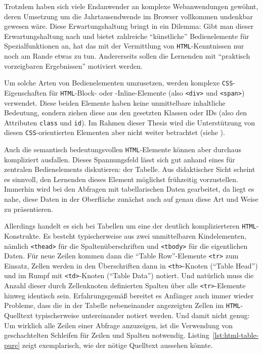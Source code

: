 Trotzdem haben sich viele Endanwender an komplexe Webanwendungen gewöhnt, deren Umsetzung um die Jahrtausendwende im Browser vollkommen undenkbar gewesen wäre. Diese Erwartungshaltung bringt \idename{} in ein Dilemma: Gibt man dieser Erwartungshaltung nach und bietet zahlreiche "`künstliche"' Bedienelemente für Spezialfunktionen an, hat das mit der Vermittlung von \texttt{HTML}-Kenntnissen nur noch am Rande etwas zu tun. Andererseits sollen die Lernenden mit "`praktisch vorzeigbaren Ergebnissen"' motiviert werden.

Um solche Arten von Bedienelementen umzusetzen, werden komplexe \texttt{CSS}-Eigenschaften für \texttt{HTML}-Block- oder -Inline-Elemente (also \texttt{<div>} und \texttt{<span>}) verwendet. Diese beiden Elemente haben keine unmittelbare inhaltliche Bedeutung, sondern ziehen diese aus den gesetzten Klassen oder IDs (also den Attributen \texttt{class} und \texttt{id}). Im Rahmen dieser Thesis wird die Unterstützung von diesen \texttt{CSS}-orientierten Elementen aber nicht weiter betrachtet (siehe ).

Auch die semantisch bedeutungsvollen \texttt{HTML}-Elemente können aber durchaus kompliziert ausfallen. Dieses Spannungsfeld lässt sich gut anhand eines für \idename{} zentralen Bedienelements diskutieren: der Tabelle. Aus didaktischer Sicht scheint es sinnvoll, den Lernenden dieses Element möglichst frühzeitig vorzustellen. Immerhin wird bei den Abfragen mit tabellarischen Daten gearbeitet, da liegt es nahe, diese Daten in der Oberfläche zunächst auch auf genau diese Art und Weise zu präsentieren.

Allerdings handelt es sich bei Tabellen um eine der deutlich komplizierteren \texttt{HTML}-Konstrukte. Es besteht typischerweise aus zwei unmittelbaren Kindelementen, nämlich \texttt{<thead>} für die Spaltenüberschriften und \texttt{<tbody>} für die eigentlichen Daten. Für neue Zeilen kommen dann die "`Table Row"'-Elemente \texttt{<tr>} zum Einsatz, Zellen werden in den Überschriften dann in \texttt{<th>}-Knoten ("`Table Head"') und im Rumpf mit \texttt{<td>}-Knoten ("`Table Data"') notiert. Und natürlich muss die Anzahl dieser durch Zellenknoten definierten Spalten über alle \texttt{<tr>}-Elemente hinweg identisch sein. Erfahrungsgemäß bereitet es Anfänger auch immer wieder Probleme, dass die in der Tabelle nebeneinander angezeigten Zellen im \texttt{HTML}-Quelltext typischerweise untereinander notiert werden. Und damit nicht genug: Um wirklich alle Zeilen einer Abfrage anzuzeigen, ist die Verwendung von geschachtelten Schleifen für Zeilen und Spalten notwendig. Listing~\ref{lst:html-table-pure} zeigt exemplarisch, wie der nötige Quelltext aussehen könnte.

